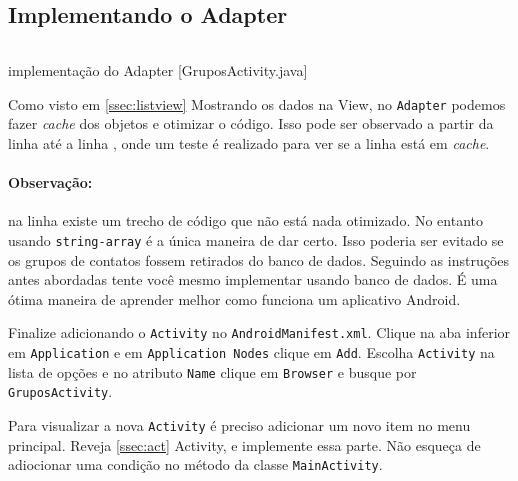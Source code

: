 \subsection{Implementando o Adapter}

\begin{listing}[H]
  \inputminted[linenos=true,frame=bottomline,tabsize=3]{ java }{ source/GruposActivity-3.java }
  \caption{implementação do Adapter [GruposActivity.java]}
\end{listing}

Como visto em \ref{ssec:listview} Mostrando os dados na View, no \texttt{Adapter} podemos fazer
\textit{cache} dos objetos e otimizar o código. Isso pode ser observado a partir da linha 
até a linha , onde um teste é realizado para ver se a linha está em \textit{cache}.

\paragraph{Observação:} na linha  existe um trecho de código que não está nada otimizado.
No entanto usando \texttt{string-array} é a única maneira de dar certo. Isso poderia ser evitado se
os grupos de contatos fossem retirados do banco de dados. Seguindo as instruções antes abordadas tente
você mesmo implementar usando banco de dados. É uma ótima maneira de aprender melhor como funciona
um aplicativo Android.

\medskip

Finalize adicionando o \texttt{Activity} no \texttt{AndroidManifest.xml}. Clique na aba inferior em
\texttt{Application} e em \texttt{Application Nodes} clique em \texttt{Add}. Escolha \texttt{Activity}
na lista de opções e no atributo \texttt{Name} clique em \texttt{Browser} e busque por
\texttt{GruposActivity}.

Para visualizar a nova \texttt{Activity} é preciso adicionar um novo item no menu principal. Reveja
\ref{ssec:act} Activity, e implemente essa parte. Não esqueça de adiocionar uma condição no método
 da classe \texttt{MainActivity}.

